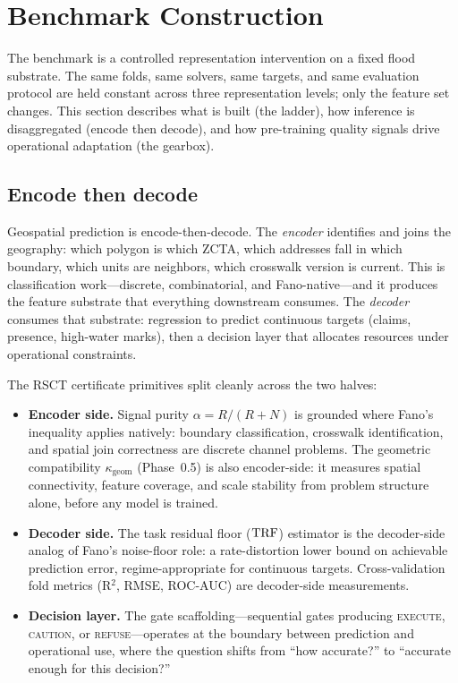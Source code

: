 \section{Benchmark Construction}
\label{sec:method}

The benchmark is a controlled representation intervention on a fixed
flood substrate. The same folds, same solvers, same targets, and same
evaluation protocol are held constant across three representation
levels; only the feature set changes. This section describes what is
built (the ladder), how inference is disaggregated (encode then decode),
and how pre-training quality signals drive operational adaptation (the
gearbox).

\subsection{Encode then decode}
\label{sec:encode-decode}

Geospatial prediction is encode-then-decode. The \emph{encoder}
identifies and joins the geography: which polygon is which ZCTA, which
addresses fall in which boundary, which units are neighbors, which
crosswalk version is current. This is classification work---discrete,
combinatorial, and Fano-native---and it produces the feature substrate
that everything downstream consumes. The \emph{decoder} consumes that
substrate: regression to predict continuous targets (claims, presence,
high-water marks), then a decision layer that allocates resources under
operational constraints.

The RSCT certificate primitives split cleanly across the two halves:
\begin{itemize}
\item \textbf{Encoder side.} Signal purity $\alpha = R/(R+N)$ is
  grounded where Fano's inequality applies natively: boundary
  classification, crosswalk identification, and spatial join correctness
  are discrete channel problems. The geometric compatibility
  $\kappa_\text{geom}$ (Phase~0.5) is also encoder-side: it measures
  spatial connectivity, feature coverage, and scale stability from
  problem structure alone, before any model is trained.
\item \textbf{Decoder side.} The task residual floor ($\mathrm{TRF}$) estimator
  is the decoder-side analog of Fano's noise-floor role: a
  rate-distortion lower bound on achievable prediction error,
  regime-appropriate for continuous targets. Cross-validation fold
  metrics (R$^2$, RMSE, ROC-AUC) are decoder-side measurements.
\item \textbf{Decision layer.} The gate scaffolding---sequential
  gates producing \textsc{execute}, \textsc{caution}, or
  \textsc{refuse}---operates at the boundary between prediction and
  operational use, where the question shifts from ``how accurate?'' to
  ``accurate enough for this decision?''
\end{itemize}

